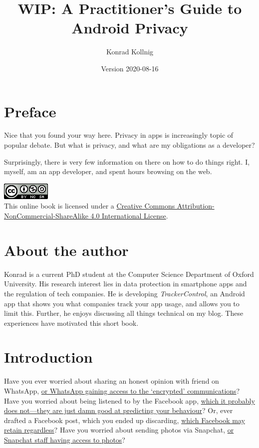 \documentclass[
]{book}
\title{WIP: A Practitioner's Guide to Android Privacy}
\author{Konrad Kollnig}
\date{Version 2020-08-16}
\begin{document}
\maketitle

{
\setcounter{tocdepth}{1}
\tableofcontents
}
\hypertarget{preface}{%
\chapter*{Preface}\label{preface}}

Nice that you found your way here. Privacy in apps is increasingly topic of popular debate. But what is privacy, and what are my obligations as a developer?

Surprisingly, there is very few information on there on how to do things right. I, myself, am an app developer, and spent hours browsing on the web.

\includegraphics{images/by-nc-sa.png}\\
This online book is licensed under a \href{http://creativecommons.org/licenses/by-nc-sa/4.0/}{Creative Commons Attribution-NonCommercial-ShareAlike 4.0 International License}.

\hypertarget{about-the-author}{%
\chapter{About the author}\label{about-the-author}}

Konrad is a current PhD student at the Computer Science Department of Oxford University. His research interest lies in data protection in smartphone apps and the regulation of tech companies. He is developing \emph{TrackerControl}, an Android app that shows you what companies track your app usage, and allows you to limit this.
Further, he enjoys discussing all things technical on my blog. These experiences have motivated this short book.

\hypertarget{intro}{%
\chapter{Introduction}\label{intro}}

Have you ever worried about sharing an honest opinion with friend on WhatsApp, \href{https://www.wired.com/story/whatsapp-security-flaws-encryption-group-chats/}{or WhatsApp gaining access to the `encrypted' communications}? Have you worried about being listened to by the Facebook app, \href{https://www.newstatesman.com/science-tech/social-media/2018/03/testing-facebook-listens-your-conversations-adverts}{which it probably does not---they are just damn good at predicting your behaviour}? Or, ever drafted a Facebook post, which you ended up discarding, \href{https://slate.com/technology/2013/12/facebook-self-censorship-what-happens-to-the-posts-you-dont-publish.html}{which Facebook may retain regardless}? Have you worried about sending photos via Snapchat, \href{https://www.vice.com/en_us/article/xwnva7/snapchat-employees-abused-data-access-spy-on-users-snaplion}{or Snapchat staff having access to photos}?
\end{document}
